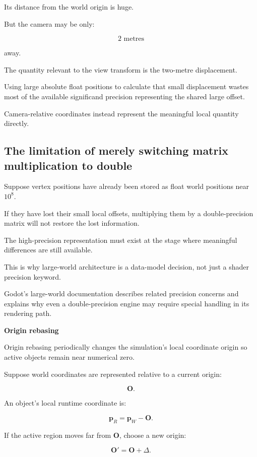 Its distance from the world origin is huge.

But the camera may be only:

\[
 2\text{ metres}
\]

away.

The quantity relevant to the view transform is the two-metre displacement.

Using large absolute float positions to calculate that small displacement wastes most of the available significand precision representing the shared large offset.

Camera-relative coordinates instead represent the meaningful local quantity directly.

\subsection{The limitation of merely switching matrix multiplication to double}\label{02-foundations-ii-ch036-the-limitation-of-merely-switching-matrix-multiplication-to-double}

Suppose vertex positions have already been stored as float world positions near \(10^8\).

If they have lost their small local offsets, multiplying them by a double-precision matrix will not restore the lost information.

The high-precision representation must exist at the stage where meaningful differences are still available.

This is why large-world architecture is a data-model decision, not just a shader precision keyword.

Godot's large-world documentation describes related precision concerns and explains why even a double-precision engine may require special handling in its rendering path. 

\textbf{Origin rebasing}

Origin rebasing periodically changes the simulation's local coordinate origin so active objects remain near numerical zero.

Suppose world coordinates are represented relative to a current origin:

\[
 \mathbf O.
\]

An object's local runtime coordinate is:

\[
 \boxed{ \mathbf p_R=\mathbf p_W-\mathbf O }.
\]

If the active region moves far from \(\mathbf O\), choose a new origin:

\[
 \mathbf O'=\mathbf O+\Delta.
\]

